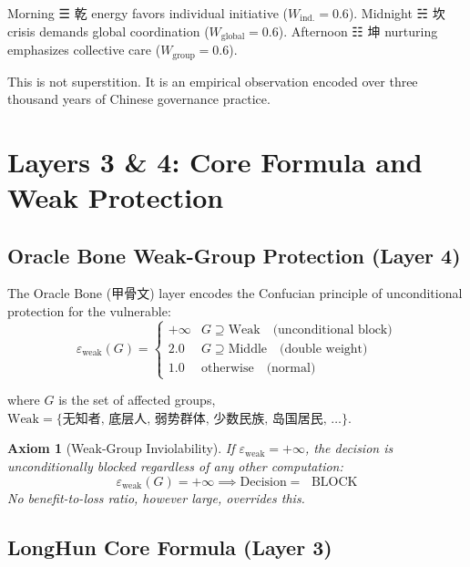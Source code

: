 \documentclass[conference]{IEEEtran}
\newtheorem{axiom}{Axiom}
\begin{document}
Morning ☰ 乾 energy favors individual initiative
($W_{\text{ind.}} = 0.6$).
Midnight ☵ 坎 crisis demands global coordination
($W_{\text{global}} = 0.6$).
Afternoon ☷ 坤 nurturing emphasizes collective care
($W_{\text{group}} = 0.6$).

This is not superstition.
It is an empirical observation encoded over
three thousand years of Chinese governance practice.

\section{Layers 3 \& 4: Core Formula and Weak Protection}
\label{sec:core}

\subsection{Oracle Bone Weak-Group Protection (Layer 4)}

The Oracle Bone (甲骨文) layer encodes the Confucian
principle of unconditional protection for the vulnerable:
\begin{equation}
  \varepsilon_{\text{weak}}(G) =
  \begin{cases}
    +\infty & G \supseteq \text{Weak}
               \quad\text{(unconditional block)} \\
    2.0     & G \supseteq \text{Middle}
               \quad\text{(double weight)} \\
    1.0     & \text{otherwise}
               \quad\text{(normal)}
  \end{cases}
  \label{eq:oracle-weak}
\end{equation}

where $G$ is the set of affected groups,
$\text{Weak} = \{\text{无知者, 底层人, 弱势群体,
少数民族, 岛国居民, \ldots}\}$.

\begin{axiom}[Weak-Group Inviolability]
If $\varepsilon_{\text{weak}} = +\infty$,
the decision is unconditionally blocked regardless
of any other computation:
\begin{equation}
  \varepsilon_{\text{weak}}(G) = +\infty
  \implies
  \text{Decision} = \text{🔴 BLOCK}
\end{equation}
No benefit-to-loss ratio, however large, overrides this.
\end{axiom}

\subsection{LongHun Core Formula (Layer 3)}
\end{document}
